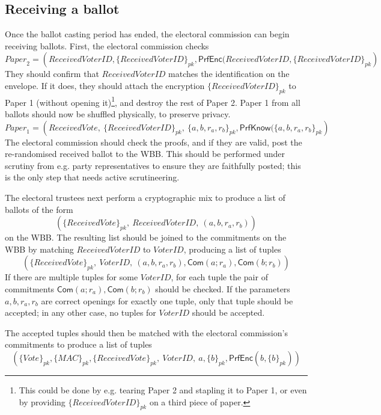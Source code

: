\documentclass[11pt,twoside,a4paper]{article}
\newcommand{\commit}{\mathsf{Com}}
\newcommand{\PrfEnc}{\mathsf{PrfEnc}}
\newcommand{\PrfKnow}{\mathsf{PrfKnow}}
\theoremstyle{definition}
\newcommand{\Vote}{\mathit{Vote}}
\newcommand{\VoterID}{\mathit{VoterID}}
\newcommand{\Paper}{\mathit{Paper}}
\newcommand{\Mac}{\mathit{MAC}}
\begin{document}
\subsection{Receiving a ballot}
Once the ballot casting period has ended, the electoral commission can begin receiving ballots. First, the electoral commission checks
$$\Paper_2=\left(ReceivedVoterID, \{ReceivedVoterID\}_{pk},\PrfEnc(ReceivedVoterID, \{ReceivedVoterID\}_{pk}\right)$$
They should confirm that $ReceivedVoterID$ matches the identification on the envelope. If it does, they should attach the encryption $\{ReceivedVoterID\}_{pk}$ to Paper 1 (without opening it)\footnote{This could be done by e.g. tearing Paper 2 and stapling it to Paper 1, or even by providing $\{ReceivedVoterID\}_{pk}$ on a third piece of paper.}, and destroy the rest of Paper 2. Paper 1 from all ballots should now be shuffled physically, to preserve privacy.
$$\Paper_1=\left(ReceivedVote,\ \{ReceivedVoterID\}_{pk},\ \{a,b,r_a,r_b\}_{pk}, \PrfKnow(\{a,b,r_a,r_b\}_{pk}\right)$$
The electoral commission should check the proofs, and if they are valid, post the re-randomised received ballot to the WBB. This should be performed under scrutiny from e.g. party representatives to ensure they are faithfully posted; this is the only step that needs active scrutineering.

The electoral trustees next perform a cryptographic mix to produce a list of ballots of the form
$$\left(\{ReceivedVote\}_{pk},\ ReceivedVoterID,\ (a,b,r_a,r_b)\right)$$
on the WBB. The resulting list should be joined to the commitments on the WBB by matching $ReceivedVoterID$ to $\VoterID$, producing a list of tuples
$$\left(\{ReceivedVote\}_{pk},\ \VoterID,\ (a,b,r_a,r_b), \commit(a;r_a), \commit(b;r_b)\right)$$
If there are multiple tuples for some $\VoterID$, for each tuple the pair of commitments $\commit(a;r_a), \commit(b;r_b)$ should be checked. If the parameters $a,b,r_a,r_b$ are correct openings for exactly one tuple, only that tuple should be accepted; in any other case, no tuples for $\VoterID$ should be accepted.

The accepted tuples should then be matched with the electoral commission's commitments to produce a list of tuples
$$\left(\{\Vote\}_{pk},\{\Mac\}_{pk}, \{ReceivedVote\}_{pk},\ \VoterID,\ a, \{b\}_{pk}, \PrfEnc(b, \{b\}_{pk})\right)$$
\end{document}
